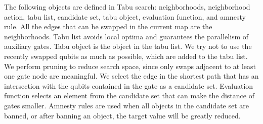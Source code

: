 \documentclass[journal]{IEEEtran}
\begin{document}
The following objects are defined in Tabu search: neighborhoods, neighborhood action, tabu list, candidate set, tabu object, evaluation function, and amnesty rule. All the edges that can be swapped in the current map are the neighborhoods. Tabu list avoids local optima and guarantees the parallelism of auxiliary gates. Tabu object is the object in the tabu list. We try not to use the recently swapped qubits as much as possible, which are added to the tabu list. We perform pruning to reduce search space, since only swaps adjacent to at least one gate node are meaningful. We select the edge in the shortest path that has an intersection with the qubits contained in the gate as a candidate set. Evaluation function selects an element from the candidate set that can make the distance of gates smaller. Amnesty rules are used when all objects in the candidate set are banned,  or after banning an object, the target value will be greatly reduced.
\end{document}

